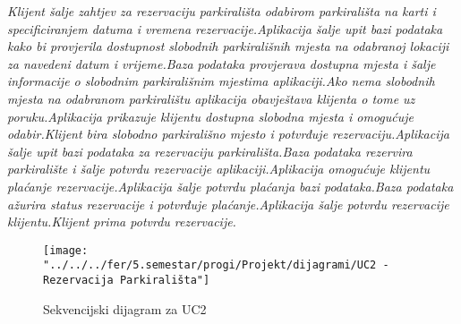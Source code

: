 \textit{Klijent šalje zahtjev za rezervaciju parkirališta odabirom parkirališta na karti i specificiranjem datuma i vremena rezervacije.Aplikacija šalje upit bazi podataka kako bi provjerila dostupnost slobodnih parkirališnih mjesta na odabranoj lokaciji za navedeni datum i vrijeme.Baza podataka provjerava dostupna mjesta i šalje informacije o slobodnim parkirališnim mjestima aplikaciji.Ako nema slobodnih mjesta na odabranom parkiralištu aplikacija obavještava klijenta o tome uz poruku.Aplikacija prikazuje klijentu dostupna slobodna mjesta i omogućuje odabir.Klijent bira slobodno parkirališno mjesto i potvrđuje rezervaciju.Aplikacija šalje upit bazi podataka za rezervaciju parkirališta.Baza podataka rezervira parkiralište i šalje potvrdu rezervacije aplikaciji.Aplikacija omogućuje klijentu plaćanje rezervacije.Aplikacija šalje potvrdu plaćanja bazi podataka.Baza podataka ažurira status rezervacije i potvrđuje plaćanje.Aplikacija šalje potvrdu rezervacije klijentu.Klijent prima potvrdu rezervacije.}


\begin{figure}
	\centering
	\texttt{[image: "../../../fer/5.semestar/progi/Projekt/dijagrami/UC2 - Rezervacija Parkirališta"]}
	\caption{Sekvencijski dijagram za UC2}
	\label{fig:uc2---rezervacija-parkiralista}
\end{figure}


	
